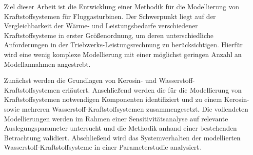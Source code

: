 Ziel dieser Arbeit ist die Entwicklung einer Methodik für die Modellierung von Kraftstoffsystemen für Fluggasturbinen. Der Schwerpunkt liegt auf der Vergleichbarkeit der Wärme- und Leistungsbedarfe verschiedener Kraftstoffsysteme in erster Größenordnung, um deren unterschiedliche Anforderungen in der Triebwerks-Leistungsrechnung zu berücksichtigen. Hierfür wird eine wenig komplexe Modellierung mit einer möglichst geringen Anzahl an Modellannahmen angestrebt.

Zunächst werden die Grundlagen von Kerosin- und Wasserstoff-Kraftstoffsystemen erläutert. Anschließend werden die für die Modellierung von Kraftstoffsystemen notwendigen Komponenten identifiziert und zu einem Kerosin- sowie mehreren Wasserstoff-Kraftstoffsystemen zusammengesetzt. Die vollendeten Modellierungen werden im Rahmen einer Sensitivitätsanalyse auf relevante Auslegungsparameter untersucht und die Methodik anhand einer bestehenden Betrachtung validiert. Abschließend wird das Systemverhalten der modellierten Wasserstoff-Kraftstoffsysteme in einer Parameterstudie analysiert.